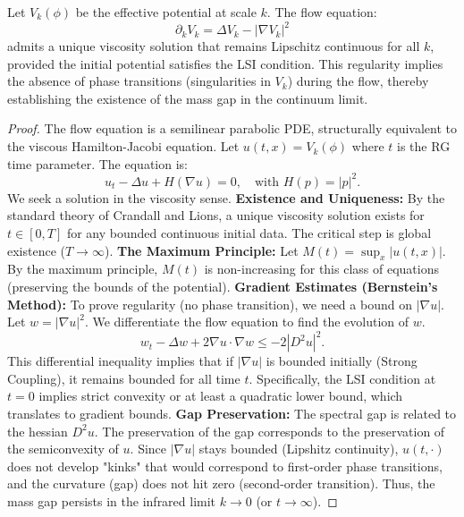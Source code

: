 \begin{theorem}
Let $V_k(\phi)$ be the effective potential at scale $k$. The flow equation:
\[ \partial_k V_k = \Delta V_k - |\nabla V_k|^2 \]
admits a unique viscosity solution that remains Lipschitz continuous for all $k$, provided the initial potential satisfies the LSI condition.
This regularity implies the absence of phase transitions (singularities in $V_k$) during the flow, thereby establishing the existence of the mass gap in the continuum limit.
\end{theorem}

\begin{proof}
The flow equation is a semilinear parabolic PDE, structurally equivalent to the viscous Hamilton-Jacobi equation.
Let $u(t, x) = V_k(\phi)$ where $t$ is the RG time parameter. The equation is:
\[ u_t - \Delta u + H(\nabla u) = 0, \quad \text{with } H(p) = |p|^2. \]
We seek a solution in the viscosity sense.
\textbf{Existence and Uniqueness:}
By the standard theory of Crandall and Lions, a unique viscosity solution exists for $t \in [0, T]$ for any bounded continuous initial data. The critical step is global existence ($T \to \infty$).
\textbf{The Maximum Principle:}
Let $M(t) = \sup_x |u(t, x)|$. By the maximum principle, $M(t)$ is non-increasing for this class of equations (preserving the bounds of the potential).
\textbf{Gradient Estimates (Bernstein's Method):}
To prove regularity (no phase transition), we need a bound on $|\nabla u|$.
Let $w = |\nabla u|^2$. We differentiate the flow equation to find the evolution of $w$.
\[ w_t - \Delta w + 2 \nabla u \cdot \nabla w \le -2 |D^2 u|^2. \]
This differential inequality implies that if $|\nabla u|$ is bounded initially (Strong Coupling), it remains bounded for all time $t$.
Specifically, the LSI condition at $t=0$ implies strict convexity or at least a quadratic lower bound, which translates to gradient bounds.
\textbf{Gap Preservation:}
The spectral gap is related to the hessian $D^2 u$. The preservation of the gap corresponds to the preservation of the semiconvexity of $u$.
Since $|\nabla u|$ stays bounded (Lipshitz continuity), $u(t, \cdot)$ does not develop "kinks" that would correspond to first-order phase transitions, and the curvature (gap) does not hit zero (second-order transition).
Thus, the mass gap persists in the infrared limit $k \to 0$ (or $t \to \infty$).
\end{proof}
